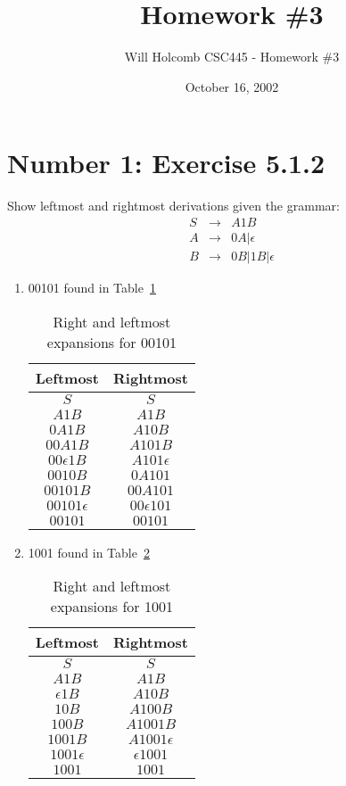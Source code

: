 \documentclass[12pt,a4paper,twoside]{article}  %
\author{Will Holcomb \small{CSC445 - Homework \#3}}
\title{Homework \#3}
\date{October 16, 2002}
\begin{document}
\maketitle

\section{Number 1: Exercise 5.1.2}
Show leftmost and rightmost derivations given the grammar:
\begin{eqnarray}
S &\rightarrow& A1B \nonumber\\
A &\rightarrow& 0A | \epsilon \nonumber\\
B &\rightarrow& 0B | 1B | \epsilon
\end{eqnarray}

\begin{enumerate}

\item 00101 found in Table~\ref{5.1.2.a}

\begin{table}
\begin{tabular}{c || c }
Leftmost & Rightmost \\
\hline\hline
$S$             & $S$ \\
$A1B$           & $A1B$ \\
$0A1B$          & $A10B$ \\
$00A1B$         & $A101B$ \\
$00\epsilon1B$  & $A101\epsilon$ \\
$0010B$         & $0A101$ \\
$00101B$        & $00A101$ \\
$00101\epsilon$ & $00\epsilon101$ \\
$00101$         & $00101$
\end{tabular}
\caption{Right and leftmost expansions for 00101}\label{5.1.2.a}
\end{table}

\item 1001 found in Table~\ref{5.1.2.b}

\begin{table}
\begin{tabular}{c || c}
Leftmost & Rightmost \\
\hline\hline
$S$             & $S$ \\
$A1B$           & $A1B$ \\
$\epsilon1B$    & $A10B$ \\
$10B$           & $A100B$ \\
$100B$          & $A1001B$ \\
$1001B$         & $A1001\epsilon$ \\
$1001\epsilon$  & $\epsilon1001$ \\
$1001$          & $1001$
\end{tabular}
\caption{Right and leftmost expansions for 1001}\label{5.1.2.b}
\end{table}


\end{enumerate}
\end{document}
